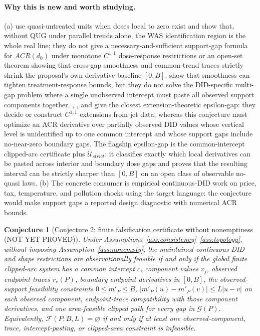 \documentclass[11pt]{article}
\theoremstyle{definition}
\theoremstyle{plain}
\newtheorem{conjecture}{Conjecture}
\theoremstyle{remark}
\begin{document}
\paragraph{Why this is new and worth studying.}
(a) \citet{DCDHK2026NoUntreated} use quasi-untreated units when doses local to zero exist and show that, without QUG under parallel trends alone, the WAS identification region is the whole real line; they do not give a necessary-and-sufficient support-gap formula for \(ACR(d_0)\) under monotone \(C^{1,1}\) dose-response restrictions or an open-set theorem showing that cross-gap smoothness and common-trend traces strictly shrink the proposal's own derivative baseline \([0,B]\).  \citet{KimKwonKwonLee2018} show that smoothness can tighten treatment-response bounds, but they do not solve the DID-specific multi-gap problem where a single unobserved intercept must paste all observed support components together.  \citet{Wells1973}, \citet{LeGruyer2009}, and \citet{DaniilidisHaddouLeGruyerLey2018} give the closest extension-theoretic epsilon-gap: they decide or construct \(C^{1,1}\) extensions from jet data, whereas this conjecture must optimize an ACR derivative over partially observed DID values whose vertical level is unidentified up to one common intercept and whose support gaps include no-near-zero boundary gaps.  The flagship epsilon-gap is the common-intercept clipped-arc certificate plus \(\mathcal{U}_{strict}\): it classifies exactly which local derivatives can be pasted across interior and boundary dose gaps and proves that the resulting interval can be strictly sharper than \([0,B]\) on an open class of observable no-quasi laws.  (b) The concrete consumer is empirical continuous-DID work on price, tax, temperature, and pollution shocks using the \citet{CallawayGoodmanBaconSantAnna2024} target language: the conjecture would make support gaps a reported design diagnostic with numerical ACR bounds.

\begin{conjecture}[Conjecture 2: finite falsification certificate without nonemptiness (NOT YET PROVED)]\label{conj:falsification}
Under Assumptions~\ref{ass:consistency}--\ref{ass:topology}, without imposing Assumption~\ref{ass:nonempty}, the maintained continuous-DID and shape restrictions are observationally feasible if and only if the global finite clipped-arc system has a common intercept \(c\), component values \(v_j\), observed endpoint traces \(r_e(P)\), boundary endpoint derivatives in \([0,B]\), the observed-support feasibility constraints \(0\le m'_P\le B\), \(|m'_P(u)-m'_P(v)|\le L|u-v|\) on each observed component, endpoint-trace compatibility with those component derivatives, and one area-feasible clipped path for every gap in \(\mathcal{G}(P)\).  Equivalently, \(\mathcal{F}(P;B,L)=\varnothing\) if and only if at least one observed-component, trace, intercept-pasting, or clipped-area constraint is infeasible.
\end{conjecture}
\end{document}
